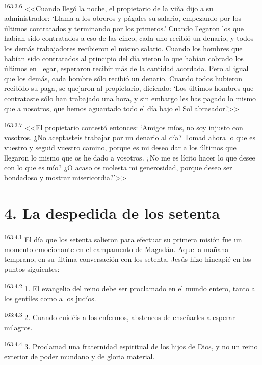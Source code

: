 \par 
\textsuperscript{163:3.6} <<Cuando llegó la noche, el propietario de la viña dijo a su administrador: `Llama a los obreros y págales su salario, empezando por los últimos contratados y terminando por los primeros.' Cuando llegaron los que habían sido contratados a eso de las cinco, cada uno recibió un denario, y todos los demás trabajadores recibieron el mismo salario. Cuando los hombres que habían sido contratados al principio del día vieron lo que habían cobrado los últimos en llegar, esperaron recibir más de la cantidad acordada. Pero al igual que los demás, cada hombre sólo recibió un denario. Cuando todos hubieron recibido su paga, se quejaron al propietario, diciendo: `Los últimos hombres que contrataste sólo han trabajado una hora, y sin embargo les has pagado lo mismo que a nosotros, que hemos aguantado todo el día bajo el Sol abrasador.'>>

\par 
\textsuperscript{163:3.7} <<El propietario contestó entonces: `Amigos míos, no soy injusto con vosotros. ¿No aceptasteis trabajar por un denario al día? Tomad ahora lo que es vuestro y seguid vuestro camino, porque es mi deseo dar a los últimos que llegaron lo mismo que os he dado a vosotros. ¿No me es lícito hacer lo que desee con lo que es mío? ¿O acaso os molesta mi generosidad, porque deseo ser bondadoso y mostrar misericordia?'>>

\section*{4. La despedida de los setenta}
\par 
\textsuperscript{163:4.1} El día que los setenta salieron para efectuar su primera misión fue un momento emocionante en el campamento de Magadán. Aquella mañana temprano, en su última conversación con los setenta, Jesús hizo hincapié en los puntos siguientes:

\par 
\textsuperscript{163:4.2} 1. El evangelio del reino debe ser proclamado en el mundo entero, tanto a los gentiles como a los judíos.

\par 
\textsuperscript{163:4.3} 2. Cuando cuidéis a los enfermos, absteneos de enseñarles a esperar milagros.

\par 
\textsuperscript{163:4.4} 3. Proclamad una fraternidad espiritual de los hijos de Dios, y no un reino exterior de poder mundano y de gloria material.

